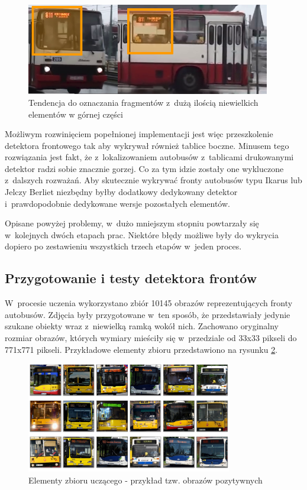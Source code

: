 \begin{figure}[!h]
	\centering
	\includegraphics[width=0.95\textwidth]{img/exp_front_detector_curiosity}
	\caption{Tendencja do oznaczania fragmentów z~dużą ilością
		niewielkich elementów w górnej części}
	\label{fig:frontdetectormorph}
\end{figure}

Możliwym rozwinięciem popełnionej implementacji jest więc przeszkolenie
detektora frontowego tak aby wykrywał również tablice boczne. Minusem
tego rozwiązania jest fakt, że z~lokalizowaniem autobusów z~tablicami
drukowanymi detektor radzi sobie znacznie gorzej. Co za tym idzie
zostały one wykluczone z~dalszych rozważań. Aby skutecznie wykrywać
fronty autobusów typu Ikarus lub Jelczy Berliet niezbędny byłby 
dodatkowy dedykowany detektor i~prawdopodobnie dedykowane wersje
pozostałych elementów.

Opisane powyżej problemy, w~dużo mniejszym stopniu powtarzały się w~kolejnych 
dwóch etapach prac. Niektóre błędy możliwe były do wykrycia dopiero po
zestawieniu wszystkich trzech etapów w~jeden proces.

\subsection{Przygotowanie i testy detektora frontów}

W~procesie uczenia wykorzystano zbiór 10145 obrazów reprezentujących fronty autobusów.
Zdjęcia były przygotowane w~ten sposób, że przedstawiały jedynie szukane obiekty
wraz z~niewielką ramką wokół nich. Zachowano oryginalny rozmiar obrazów, których
wymiary mieściły się w~przedziale od 33x33 pikseli do 771x771 pikseli.
Przykładowe elementy zbioru przedstawiono na rysunku \ref{fig:exp_second_crop_sample}.

\begin{figure}[!h]
	\centering
	\includegraphics[width=0.8\textwidth]{img/exp_second_crop_sample}
	\caption{Elementy zbioru uczącego - przykład tzw. obrazów pozytywnych}
	\label{fig:exp_second_crop_sample}
\end{figure}

